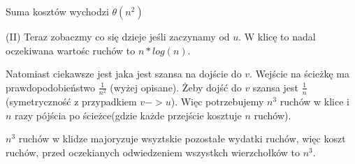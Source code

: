 Suma kosztów wychodzi \(\theta(n^2)\)

(II) Teraz zobaczmy co się dzieje jeśli zaczynamy od \(u\). W klicę to nadal oczekiwana wartośc ruchów to \(n*log(n)\).

Natomiast ciekawsze jest jaka jest szansa na dojście do \(v\). Wejście na ścieżkę ma prawdopodobieństwo \(\frac{1}{n^2}\) (wyżej opisane). Żeby dojść do \(v\) szansa jest \(\frac{1}{n}\) (symetryczność z przypadkiem \(v->u\)). Więc potrzebujemy \(n^3\) ruchów w klice i \(n\) razy pójścia po ścieżce(gdzie każde przejście kosztuje \(n\) ruchów).

\(n^3\) ruchów w klidze majoryzuje wsyztskie pozostałe wydatki ruchów, więc koszt ruchów, przed oczekianych odwiedzeniem wszystkch wierzchołków to \(n^3\).

